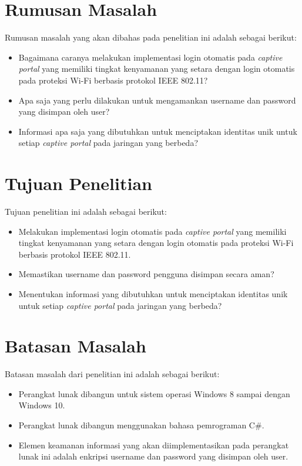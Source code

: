 \section{Rumusan Masalah}
\label{sec:rumusan_masalah}

Rumusan masalah yang akan dibahas pada penelitian ini adalah sebagai berikut:

\begin{itemize}
	\item{Bagaimana caranya melakukan implementasi login otomatis pada \textit{captive portal} yang memiliki tingkat kenyamanan yang setara dengan login otomatis pada proteksi Wi-Fi berbasis protokol IEEE 802.11?}
	\item{Apa saja yang perlu dilakukan untuk mengamankan username dan password yang disimpan oleh user?}
	\item{Informasi apa saja yang dibutuhkan untuk menciptakan identitas unik untuk setiap \textit{captive portal} pada jaringan yang berbeda?}
\end{itemize}



\section{Tujuan Penelitian}
\label{sec:tujuan_penelitian}

Tujuan penelitian ini adalah sebagai berikut:

\begin{itemize}
	\item{Melakukan implementasi login otomatis pada \textit{captive portal} yang memiliki tingkat kenyamanan yang setara dengan login otomatis pada proteksi Wi-Fi berbasis protokol IEEE 802.11.}
	\item{Memastikan username dan password pengguna disimpan secara aman?}
	\item{Menentukan informasi yang dibutuhkan untuk menciptakan identitas unik untuk setiap \textit{captive portal} pada jaringan yang berbeda?}
\end{itemize}



\section{Batasan Masalah}
\label{sec:batasan_masalah}

Batasan masalah dari penelitian ini adalah sebagai berikut:

\begin{itemize}
	\item{Perangkat lunak dibangun untuk sistem operasi Windows 8 sampai dengan Windows 10.}
    \item{Perangkat lunak dibangun menggunakan bahasa pemrograman C\#.}
	\item{Elemen keamanan informasi yang akan diimplementasikan pada perangkat lunak ini adalah enkripsi username dan password yang disimpan oleh user.}
\end{itemize}



